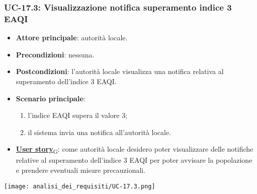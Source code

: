 \subsubsection{UC-17.3: Visualizzazione notifica superamento indice 3 EAQI}
\begin{itemize}
	\item \textbf{Attore principale}: autorità locale.
	\item \textbf{Precondizioni}: nessuna.
	\item \textbf{Postcondizioni}: l'autorità locale visualizza una notifica relativa al superamento dell'indice 3 EAQI.
	\item \textbf{Scenario principale}:
	      \begin{enumerate}
		      \item l'indice EAQI supera il valore 3;
		      \item il sistema invia una notifica all'autorità locale.
	      \end{enumerate}
	\item \href{https://7last.github.io/docs/pb/documentazione-interna/glossario\#user-story}{\textbf{User story}\textsubscript{G}}:
	      come autorità locale desidero poter visualizzare delle notifiche relative al superamento dell'indice 3 EAQI
	      per poter avvisare la popolazione e prendere eventuali misure precauzionali.
\end{itemize}
\begin{center}
	\texttt{[image: analisi\_dei\_requisiti/UC-17.3.png]}
\end{center}

